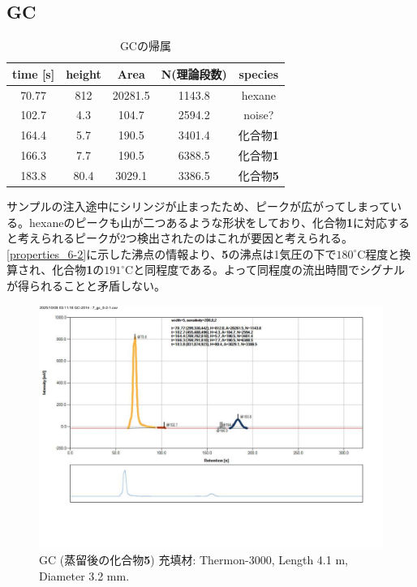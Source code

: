 \documentclass{ltjsarticle}
\theoremstyle{definition}
\numberwithin{equation}{section}
\newcommand{\D}{^\circ\text{C}}
\begin{document}
\subsection{GC}
\begin{table}[htp]
\caption{GCの帰属}
\begin{center}
\begin{tabular}{ccccc}
\toprule
time [s] & height & Area & N(理論段数) & species\\
\midrule
70.77 & 812 & 20281.5 & 1143.8 & hexane\\
102.7 & 4.3 & 104.7 & 2594.2 & noise? \\
164.4 & 5.7 & 190.5 & 3401.4 & 化合物\textbf{1}\\
166.3 & 7.7 & 190.5 & 6388.5 & 化合物\textbf{1}\\
183.8 & 80.4 & 3029.1 & 3386.5 & 化合物\textbf{5} \\
\bottomrule
\end{tabular}
\end{center}
\label{GC_6-2_attribute}
\end{table}%
サンプルの注入途中にシリンジが止まったため、ピークが広がってしまっている。hexaneのピークも山が二つあるような形状をしており、化合物\textbf{1}に対応すると考えられるピークが2つ検出されたのはこれが要因と考えられる。\\
\ref{properties_6-2}に示した沸点の情報より、\textbf{5}の沸点は1気圧の下で$180\D$程度と換算され、化合物\textbf{1}の$191\D$と同程度である。よって同程度の流出時間でシグナルが得られることと矛盾しない。

\begin{figure}[htbp]
\begin{center}
\includegraphics[width = 15 cm]{GC_6-2-1.pdf}
\caption{GC (蒸留後の化合物\textbf{5}) 充填材: Thermon-3000, Length 4.1 m, Diameter 3.2 mm.}
\label{GC_6-2}
\end{center}
\end{figure}
\end{document}
